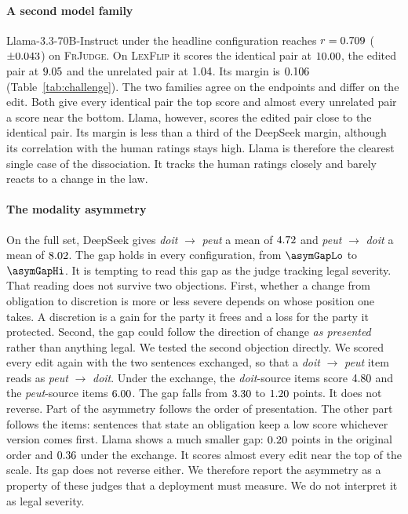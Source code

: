 \documentclass{BVP_JCLLT}
\begin{document}
{\paragraph{A second model family}
Llama-3.3-70B-Instruct under the headline configuration reaches $r=0.709$
($\pm0.043$) on \textsc{FrJudge}. On \textsc{LexFlip} it scores the
identical pair at $10.00$, the edited pair at $9.05$ and the
unrelated pair at $1.04$. Its margin is $0.106$
(Table~\ref{tab:challenge}). The two families agree on the endpoints and
differ on the edit. Both give every identical pair the top score and almost
every unrelated pair a score near the bottom. Llama, however, scores the edited
pair close to the identical pair. Its margin is less than a third of the
DeepSeek margin, although its correlation with the human ratings stays high.
Llama is therefore the clearest single case of the dissociation. It tracks the
human ratings closely and barely reacts to a change in the law.

\paragraph{The modality asymmetry}
On the full set, DeepSeek gives \emph{doit} $\rightarrow$ \emph{peut} a mean of
$4.72$ and \emph{peut} $\rightarrow$ \emph{doit} a mean of
$8.02$. The gap holds in every configuration, from
$\asymGapLo$ to $\asymGapHi$. It is tempting to read this gap as the judge
tracking legal severity. That reading does not survive two objections. First,
whether a change from obligation to discretion is more or less severe depends
on whose position one takes. A discretion is a gain for the party it frees and a
loss for the party it protected. Second, the gap could follow the direction of
change \emph{as presented} rather than anything legal. We tested the second
objection directly. We scored every edit again with the two sentences exchanged,
so that a \emph{doit} $\rightarrow$ \emph{peut} item reads as \emph{peut}
$\rightarrow$ \emph{doit}. Under the exchange, the \emph{doit}-source items
score $4.80$ and the \emph{peut}-source items $6.00$.
The gap falls from $3.30$ to $1.20$ points. It does not
reverse. Part of the asymmetry follows the order of presentation. The other part
follows the items: sentences that state an obligation keep a low score whichever
version comes first. Llama shows a much smaller gap: $0.20$ points
in the original order and $0.36$ under the exchange. It scores almost
every edit near the top of the scale. Its gap does not reverse
either. We therefore
report the asymmetry as a property of these judges that a deployment must
measure. We do not interpret it as legal severity.

}
\end{document}
